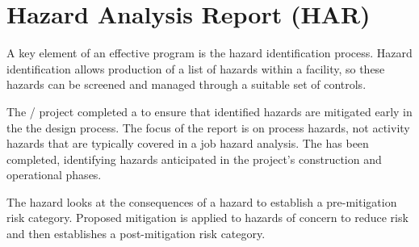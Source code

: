 \section{Hazard Analysis Report (HAR)}

A key element of an effective  program is the hazard
identification process. Hazard identification allows production of a
list of hazards within a facility, so these hazards can be screened
and managed through a suitable set of controls.

The / project completed a 
to ensure that identified hazards are mitigated early in the
the design process.  The focus of the report is on process hazards,
not activity hazards that are typically covered in a job hazard
analysis.  The  has been completed, identifying
hazards anticipated in the project's construction and operational
phases.

The hazard  looks at the consequences of a hazard
to establish a pre-mitigation risk category. Proposed mitigation is
applied to hazards of concern to reduce risk and then establishes a
post-mitigation risk category.

